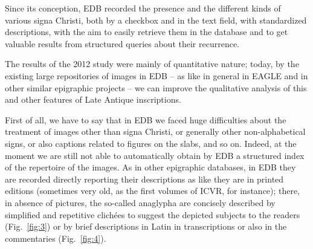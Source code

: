 \documentclass[amsthm,ebook]{saparticle}
\begin{document}
Since its conception, EDB recorded the presence and the different kinds of various signa Christi, both by a checkbox and
in the text field, with standardized descriptions, with the aim to easily retrieve them in the database and to get
valuable results from structured queries about their recurrence.

The results of the 2012 study were mainly of quantitative nature; today, by the existing large repositories of images in
EDB – as like in general in EAGLE and in other similar epigraphic projects – we can improve the qualitative analysis of
this and other features of Late Antique inscriptions.

First of all, we have to say that in EDB we faced huge difficulties about the treatment of images other than signa
Christi, or generally other non-alphabetical signs, or also captions related to figures on the slabs, and so on.
Indeed, at the moment we are still not able to automatically obtain by EDB a structured index of the repertoire of the
images. As in other epigraphic databases, in EDB they are recorded directly reporting their descriptions as like they
are in printed editions (sometimes very old, as the first volumes of ICVR, for instance); there, in absence of
pictures, the so-called anaglypha are concisely described by simplified and repetitive clichées to suggest the depicted
subjects to the readers (Fig.~\ref{fig:3}) or by brief descriptions in Latin in transcriptions or also in the commentaries (Fig.~\ref{fig:4}). 
\end{document}
